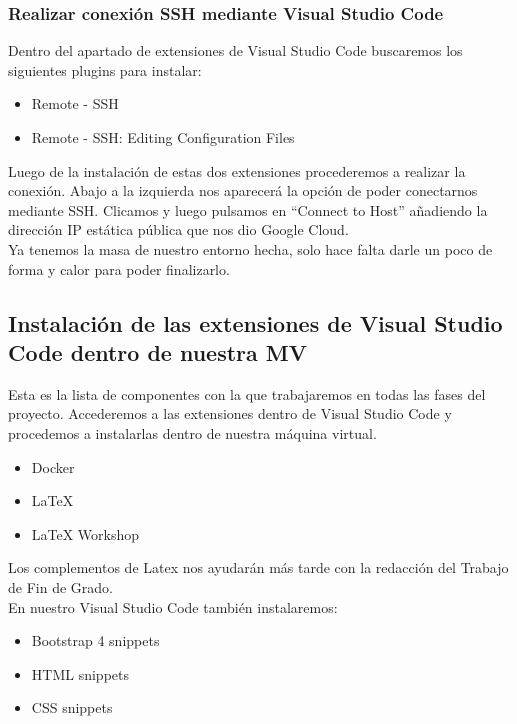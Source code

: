 \subsubsection{Realizar conexión SSH mediante Visual Studio Code}
Dentro del apartado de extensiones de Visual Studio Code buscaremos los siguientes plugins para instalar:

\begin{itemize}
    \item Remote - SSH
    \item Remote - SSH: Editing Configuration Files
\end{itemize}

Luego de la instalación de estas dos extensiones procederemos a realizar la conexión. Abajo a la izquierda nos aparecerá la opción de poder conectarnos mediante SSH. Clicamos y luego pulsamos en ``Connect to Host'' añadiendo la dirección IP estática pública que nos dio Google Cloud.
\\Ya tenemos la masa de nuestro entorno hecha, solo hace falta darle un poco de forma y calor para poder finalizarlo.

\subsection{Instalación de las extensiones de Visual Studio Code dentro de nuestra MV}

Esta es la lista de componentes con la que trabajaremos en todas las fases del proyecto. Accederemos a las extensiones dentro de Visual Studio Code y procedemos a instalarlas dentro de nuestra máquina virtual.

\begin{itemize}
    \item Docker
    \item LaTeX
    \item LaTeX Workshop
\end{itemize}

Los complementos de Latex nos ayudarán más tarde con la redacción del Trabajo de Fin de Grado.
\\En nuestro Visual Studio Code también instalaremos:

\begin{itemize}
    \item Bootstrap 4 snippets
    \item HTML snippets
    \item CSS snippets
\end{itemize}

